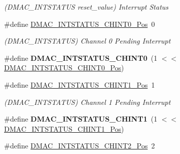 \begin{DoxyCompactItemize}
\begin{DoxyCompactList}\small\item\em (D\+M\+A\+C\+\_\+\+I\+N\+T\+S\+T\+A\+T\+U\+S reset\+\_\+value) Interrupt Status \end{DoxyCompactList}\item 
\hypertarget{group___s_a_m_l21___d_m_a_c_gae6a58d465f72f61fc16e0bc070654986}{}\#define \hyperlink{group___s_a_m_l21___d_m_a_c_gae6a58d465f72f61fc16e0bc070654986}{D\+M\+A\+C\+\_\+\+I\+N\+T\+S\+T\+A\+T\+U\+S\+\_\+\+C\+H\+I\+N\+T0\+\_\+\+Pos}~0\label{group___s_a_m_l21___d_m_a_c_gae6a58d465f72f61fc16e0bc070654986}

\begin{DoxyCompactList}\small\item\em (D\+M\+A\+C\+\_\+\+I\+N\+T\+S\+T\+A\+T\+U\+S) Channel 0 Pending Interrupt \end{DoxyCompactList}\item 
\hypertarget{group___s_a_m_l21___d_m_a_c_gab954db34e13380adaba5754f72f7423c}{}\#define {\bfseries D\+M\+A\+C\+\_\+\+I\+N\+T\+S\+T\+A\+T\+U\+S\+\_\+\+C\+H\+I\+N\+T0}~(1 $<$$<$ \hyperlink{group___s_a_m_l21___d_m_a_c_gae6a58d465f72f61fc16e0bc070654986}{D\+M\+A\+C\+\_\+\+I\+N\+T\+S\+T\+A\+T\+U\+S\+\_\+\+C\+H\+I\+N\+T0\+\_\+\+Pos})\label{group___s_a_m_l21___d_m_a_c_gab954db34e13380adaba5754f72f7423c}

\item 
\hypertarget{group___s_a_m_l21___d_m_a_c_ga6eb85bab65c6a5be69880151236dcb0a}{}\#define \hyperlink{group___s_a_m_l21___d_m_a_c_ga6eb85bab65c6a5be69880151236dcb0a}{D\+M\+A\+C\+\_\+\+I\+N\+T\+S\+T\+A\+T\+U\+S\+\_\+\+C\+H\+I\+N\+T1\+\_\+\+Pos}~1\label{group___s_a_m_l21___d_m_a_c_ga6eb85bab65c6a5be69880151236dcb0a}

\begin{DoxyCompactList}\small\item\em (D\+M\+A\+C\+\_\+\+I\+N\+T\+S\+T\+A\+T\+U\+S) Channel 1 Pending Interrupt \end{DoxyCompactList}\item 
\hypertarget{group___s_a_m_l21___d_m_a_c_gae43103b6057890773f685cd3fc399539}{}\#define {\bfseries D\+M\+A\+C\+\_\+\+I\+N\+T\+S\+T\+A\+T\+U\+S\+\_\+\+C\+H\+I\+N\+T1}~(1 $<$$<$ \hyperlink{group___s_a_m_l21___d_m_a_c_ga6eb85bab65c6a5be69880151236dcb0a}{D\+M\+A\+C\+\_\+\+I\+N\+T\+S\+T\+A\+T\+U\+S\+\_\+\+C\+H\+I\+N\+T1\+\_\+\+Pos})\label{group___s_a_m_l21___d_m_a_c_gae43103b6057890773f685cd3fc399539}

\item 
\hypertarget{group___s_a_m_l21___d_m_a_c_ga6ab2f539c518339e75ad66c6438a8a45}{}\#define \hyperlink{group___s_a_m_l21___d_m_a_c_ga6ab2f539c518339e75ad66c6438a8a45}{D\+M\+A\+C\+\_\+\+I\+N\+T\+S\+T\+A\+T\+U\+S\+\_\+\+C\+H\+I\+N\+T2\+\_\+\+Pos}~2\label{group___s_a_m_l21___d_m_a_c_ga6ab2f539c518339e75ad66c6438a8a45}


\end{DoxyCompactItemize}
